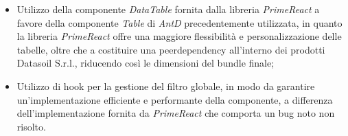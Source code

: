 \begin{itemize}
\begin{itemize}
                  \item Utilizzo della componente \textit{DataTable} fornita dalla libreria \textit{PrimeReact} a favore della componente \textit{Table} di \textit{AntD} precedentemente utilizzata,
                        in quanto la libreria \textit{PrimeReact} offre una maggiore flessibilità e personalizzazione delle tabelle, oltre che a costituire una peerdependency all'interno dei
                        prodotti Datasoil S.r.l., riducendo così le dimensioni del bundle finale;
                  \item Utilizzo di hook per la gestione del filtro globale, in modo da garantire un'implementazione efficiente e performante della componente, a differenza dell'implementazione
                        fornita da \textit{PrimeReact} che comporta un bug noto non risolto. \label{item:hookTable}
            \end{itemize}
\end{itemize}

